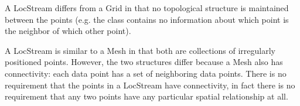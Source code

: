A LocStream differs from a Grid in that no topological structure is
maintained between the points
(e.g. the class contains no information about which point is the neighbor
of which other point).

A LocStream is similar to a Mesh in that both are collections of irregularly positioned 
points.  However, the two structures differ because a Mesh also has connectivity: 
each data point has a set of neighboring data points. There is no requirement that the
points in a LocStream have connectivity, in fact there is no requirement that any two points 
have any particular spatial relationship at all.
